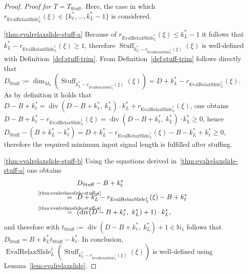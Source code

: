 \documentclass[journal]{IEEEtran}
\newcommand{\N}{\mathbb{N}}
\newcommand{\ROI}{B}
\newcommand{\discint}[2]{\{#1,\dotsc,#2\}}
\newcommand{\inint}[2]{\in\discint{#1}{#2}}
\DeclareMathOperator{\Stuffing}{Stuff}
\renewcommand{\div}[2]{\operatorname{div}(#1,\ #2)}
\newcommand{\equsing}[1]{\overset{\mathclap{\text{#1}}}{=}}
\DeclareMathOperator{\EvalRelaxSlide}{EvalRelaxSlide}
\begin{document}
\begin{proof}
{\parindent0mm \emph{Proof for $T = T_{\Stuffing}$.}}
Here, the case in which $r_{\EvalRelaxSlide_L^\ell}(\xi)\inint{k_\ell^*}{k_L^* - 1}$ is considered.

\ref{thm:evalrelaxslide-stuff-a}
Because of $r_{\EvalRelaxSlide_L^\ell}(\xi) \leq k_L^* - 1$ it follows that $k_L^* - r_{\EvalRelaxSlide_L^\ell}(\xi) \geq 1$, therefore $\Stuffing_{k_L^* - r_{\EvalRelaxSlide_L^\ell}(\xi)}(\xi)$ is well-defined with Definition~\ref{def:stuff-trim}.
From Definition~\ref{def:stuff-trim} follows directly that $D_{\Stuffing} := \dim_{M_0}( \Stuffing_{k_L^* - r_{\EvalRelaxSlide_L^\ell}(\xi)}(\xi) ) = D + k_L^* - r_{\EvalRelaxSlide_L^\ell}(\xi)$.
As by definition it holds that $D - \ROI + k_\ell^* = \div{D - \ROI + k_\ell^*}{k_L^*}\cdot k_L^* + r_{\EvalRelaxSlide_L^\ell}(\xi)$, one obtains $D - \ROI + k_\ell^* - r_{\EvalRelaxSlide_L^\ell}(\xi) = \div{D - \ROI + k_\ell^*}{k_L^*}\cdot k_L^* \geq 0$, hence $D_{\Stuffing} - (\ROI + k_L^* - k_\ell^*) = D + k_L^* - r_{\EvalRelaxSlide_L^\ell}(\xi) - \ROI - k_L^* + k_\ell^* \geq 0$, therefore the required minimum input signal length is fulfilled after stuffing.

\ref{thm:evalrelaxslide-stuff-b}
Using the equations derived in~\ref{thm:evalrelaxslide-stuff-a} one obtains
\begin{align*}
  & D_{\Stuffing} - \ROI + k_\ell^*\\
  \equsing{\ref{thm:evalrelaxslide-stuff-a}}\ \ & D + k_L^* - r_{\EvalRelaxSlide_L^\ell}(\xi) - \ROI + k_\ell^*\\
  \equsing{\ref{thm:evalrelaxslide-stuff-a}}\ \ & (\div{D - \ROI + k_\ell^*}{k_L^*} + 1)\cdot k_L^*\text{,}
\end{align*}
and therefore with $t_{\Stuffing} := \div{D - \ROI + k_\ell^*}{k_L^*} + 1\in\N_1$ follows that $D_{\Stuffing} = \ROI + k_L^* t_{\Stuffing} - k_\ell^*$.
In conclusion, $\EvalRelaxSlide_L^\ell( \Stuffing_{k_L^* - r_{\EvalRelaxSlide_L^\ell}(\xi)}(\xi) )$ is well-defined using Lemma~\ref{lem:evalrelaxslide}.


\end{proof}
\end{document}
